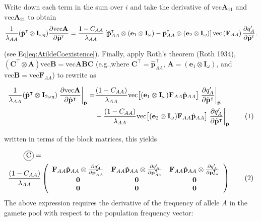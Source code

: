 \documentclass[11pt]{article}
\newcommand\encircle[1]{%
  \tikz[baseline=(X.base)] 
    \node (X) [draw, shape=circle, inner sep=0] {\strut #1};}
\newcommand\numberthis{\addtocounter{equation}{1}\tag{\theequation}}
\def\mbf#1{\mathbf{#1}}
\newcommand{\bo}[1]{{\bf #1}}
\newcommand{\tr}{{\mbox{\tiny \sf T}}}
\begin{document}
Write down each term in the sum over $i$ and take the derivative of $\mbox{vec}\mathbf{A}_{11}$ and $\mbox{vec}\mathbf{A}_{21}$ to obtain
\begin{equation}
\frac{1}{\lambda_{AA}}(\hat{\mathbf{p}}^\tr \otimes \mathbf{I}_{\omega g})\frac{\partial \mbox{vec} \mathbf{A}}{\partial \tilde{\bo p}^\tr}
=
\frac{1-C_{AA}}{\lambda_{AA}}\left[  \hat{\bo p}_{AA}^\tr\otimes \left(\mathbf{e}_{1} \otimes \mathbf{I}_\omega\right)-\hat{\bo p}_{AA}^\tr\otimes \left(\mathbf{e}_{2} \otimes \mathbf{I}_\omega\right) \right] \mbox{vec} \left(\mathbf{F}_{AA}\right)\frac{\partial q^\prime_A}{\partial \tilde{\bo p}^\tr}. 
\end{equation}

\noindent (see Eq{\ref{eq:AtildeCoexistence}}).  Finally, apply Roth's theorem (Roth 1934), $\left( \mbf{C}^{\intercal} \otimes \mbf{A} \right) \text{vec}\mbf{B} = \text{vec}\mbf{ABC}$ (e.g.,where $\mbf{C}^{\intercal} = \hat{\mbf{p}}^{\intercal}_{AA}$, $\mbf{A} = (\mbf{e}_1 \otimes \mbf{I}_{\omega})$, and $\text{vec}\mbf{B} = \text{vec}\mbf{F}_{AA}$) to rewrite as

\begin{align*}
	\frac{1}{\lambda_{AA}}(\hat{\mbf{p}}^{\intercal} \otimes \mbf{I}_{2 \omega g}) \left. \frac{ \partial \text{vec}\mbf{A}}{\partial \hat{\mbf{p}}^{\intercal}} \right|_{\hat{\mbf{p}}} = 
		&\frac{(1 - C_{AA})}{\lambda_{AA}}  \text{vec}\big[(\mbf{e}_{1} \otimes \mbf{I}_{\omega}) \mbf{F}_{AA} \hat{\mbf{p}}_{AA}\big]  \left.\frac{\partial q^{\prime}_{A}}{\partial \tilde{\mbf{p}}^{\intercal}} \right|_{\hat{\mbf{p}}}  \\
		&- \frac{(1 - C_{AA})}{\lambda_{AA}}  \text{vec}\big[(\mbf{e}_{2} \otimes \mbf{I}_{\omega}) \mbf{F}_{AA} \hat{\mbf{p}}_{AA}\big]  \left.\frac{\partial q^{\prime}_{A}}{\partial \tilde{\mbf{p}}^{\intercal}} \right|_{\hat{\mbf{p}}}  \label{eq:partCwithpartials_app} \numberthis
\end{align*}

\noindent written in terms of the block matrices, this yields

{
\scriptsize
\begin{align*}
	\encircle{C} =& \\
	\frac{(1 - C_{AA})}{\lambda_{AA}} &\left(
			\begin{array}{ccc}
			\mbf{F}_{AA}\hat{\mbf{p}}_{AA} \otimes \frac{\partial q^{\prime}_{A}}{\partial \mbf{p}^{ \intercal}_{AA}}  &  \mbf{F}_{AA}\hat{\mbf{p}}_{AA} \otimes \frac{\partial q^{\prime}_{A}}{\partial \mbf{p}^{ \intercal}_{Aa}}  &  \mbf{F}_{AA}\hat{\mbf{p}}_{AA} \otimes \frac{\partial q^{\prime}_{A}}{\partial \mbf{p}^{ \intercal}_{aa}}\\
				\mbf{0} & \mbf{0} & \mbf{0}  \\
				\mbf{0} & \mbf{0} & \mbf{0} 
			\end{array} \right)  \numberthis			
\end{align*}
}
The above expression requires the derivative of the frequency of allele $A$ in the gamete pool with respect to the population frequency vector:
\end{document}
